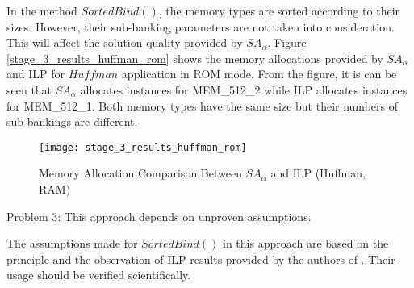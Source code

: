 		In the method $SortedBind()$, the memory types are sorted according to their sizes.
		However, their sub-banking parameters are not taken into consideration. This will affect
		the solution quality provided by $SA_{\alpha}$. Figure \ref{stage_3_results_huffman_rom}
		shows the memory allocations provided by $SA_{\alpha}$ and ILP for $Huffman$
		application in ROM mode. From the figure, it is can be seen that $SA_{\alpha}$ allocates
		instances for MEM\_512\_2 while ILP allocates instances for MEM\_512\_1.
		Both memory types have the same size but their numbers of sub-bankings are different.
		\begin{figure}[htb]
			\begin{center}
				\texttt{[image: stage\_3\_results\_huffman\_rom]}
				\caption{Memory Allocation Comparison Between $SA_{\alpha}$ and ILP (Huffman, RAM)}
				\label{fig:stage_3_results_huffman_rom}
			\end{center}
		\end{figure}		
		
		Problem 3: This approach depends on unproven assumptions.
		
		The assumptions made for $SortedBind()$ in this approach are based on the principle and
		the observation of ILP results provided by the authors of \cite{Strobel2016}.
		Their usage should be verified scientifically.
		
		
		
			
		
		
		
		
	
	
	